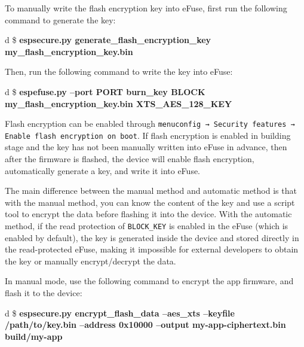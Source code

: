 \documentclass[a4paper,12pt]{book}
\begin{document}
To manually write the flash encryption key into eFuse, first run the following command to generate the key:

\begin{codebloc}
\begin{tabular}{d}
\$ \textbf{espsecure.py generate\_flash\_encryption\_key my\_flash\_encryption\_key.bin}
\end{tabular}
\end{codebloc}

Then, run the following command to write the key into eFuse:

\begin{codebloc}
\begin{tabular}{d}
\fontsize{9.5pt}{10pt}\selectfont
\$ \textbf{espefuse.py --port PORT burn\_key BLOCK my\_flash\_encryption\_key.bin XTS\_AES\_128\_KEY}
\end{tabular}
\end{codebloc}


Flash encryption can be enabled through \verb|menuconfig → Security features → |\\ \verb|Enable flash encryption on boot|. If flash encryption is enabled in building stage and the key has not been manually written into eFuse in advance, then after the firmware is flashed, the device will enable flash encryption, automatically generate a key, and write it into eFuse.

The main difference between the manual method and automatic method is that with the manual method, you can know the content of the key and use a script tool to encrypt the data before flashing it into the device. With the automatic method, if the read protection of \verb|BLOCK_KEY| is enabled in the eFuse (which is enabled by default), the key is generated inside the device and stored directly in the read-protected eFuse, making it impossible for external developers to obtain the key or manually encrypt/decrypt the data.

In manual mode, use the following command to encrypt the app firmware, and flash it to the device:

\begin{codebloc}
\begin{tabular}{d}
\$ \textbf{espsecure.py encrypt\_flash\_data --aes\_xts --keyfile /path/to/key.bin --address 0x10000 --output my-app-ciphertext.bin build/my-app}
\end{tabular}
\end{codebloc}
\end{document}
